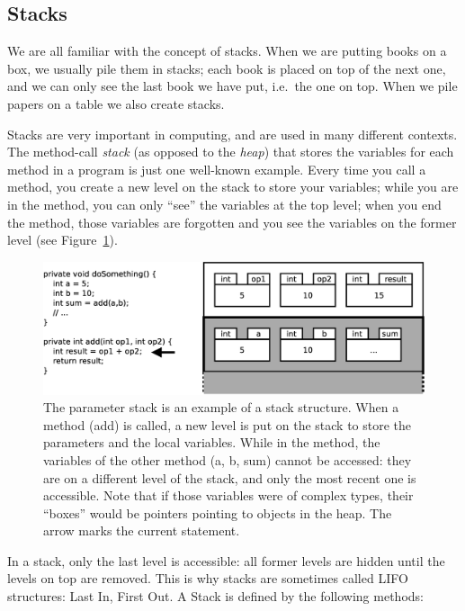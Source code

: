 \subsection{Stacks}
\label{sec:stacks}

We are all familiar with the concept of stacks. When we are putting
books on a box, we usually pile them in stacks; each book is placed 
on top of the
next one, and we can only see the last book we have put, i.e.~the one
on top. When we pile papers on a table we also create stacks. 

Stacks are very important in computing, and are used in many different
contexts. The method-call \emph{stack} (as opposed to the \emph{heap}) 
that stores the variables for each
method in a program is just one well-known example. Every time you
call a method, you create a new level on the stack to store your
variables; while you are in the method, you can only ``see'' the
variables at the top level; when you end the method, those variables are
forgotten and you see the variables on the former level (see
Figure~\ref{fig:stackparameter}).  

\begin{figure}[bthp]
  \centering
  \includegraphics[width=\textwidth]{gfx/parameter-stack}
  \caption{The parameter stack is an example of a stack
    structure. When a method (add) is called, a new level is put on the
    stack to store the parameters and the local variables. While in
    the method, the variables of the other method (a, b, sum) cannot
    be accessed: they are on a different level of the stack, and only
    the most recent one is accessible. Note that if those variables
    were of complex types, their ``boxes'' would be pointers pointing
    to objects in the heap. The arrow marks the current statement.}
  \label{fig:stackparameter}
\end{figure}

In a stack, only the last level is accessible: all former levels are
hidden until the levels on top are removed. This is why stacks are
sometimes called LIFO structures: Last In, First Out. A Stack is
defined by the following methods:

